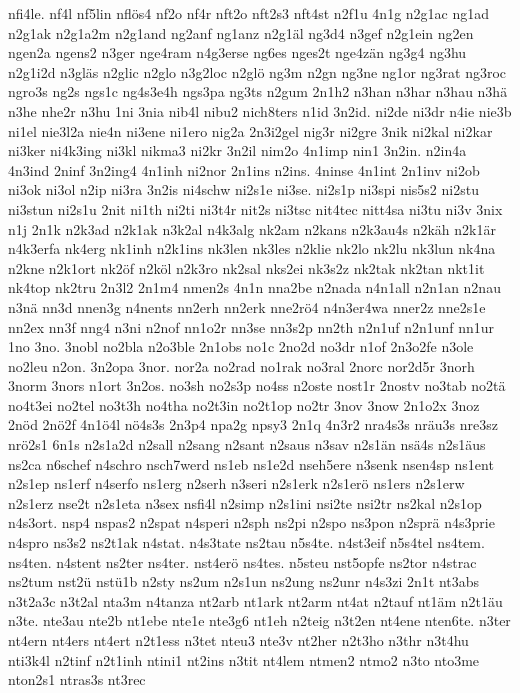 {nfi4le.
nf4l
nf5lin
nflös4
nf2o
nf4r
nft2o
nft2s3
nft4st
n2f1u
4n1g
n2g1ac
ng1ad
n2g1ak
n2g1a2m
n2g1and
ng2anf
ng1anz
n2g1äl
ng3d4
n3gef
n2g1ein
ng2en
ngen2a
ngens2
n3ger
nge4ram
n4g3erse
ng6es
nges2t
nge4zän
ng3g4
ng3hu
n2g1i2d
n3gläs
n2glic
n2glo
n3g2loc
n2glö
ng3m
n2gn
ng3ne
ng1or
ng3rat
ng3roc
ngro3s
ng2s
ngs1c
ng4s3e4h
ngs3pa
ng3ts
n2gum
2n1h2
n3han
n3har
n3hau
n3hä
n3he
nhe2r
n3hu
1ni
3nia
nib4l
nibu2
nich8ters
n1id
3n2id.
ni2de
ni3dr
n4ie
nie3b
ni1el
nie3l2a
nie4n
ni3ene
ni1ero
nig2a
2n3i2gel
nig3r
ni2gre
3nik
ni2kal
ni2kar
ni3ker
ni4k3ing
ni3kl
nikma3
ni2kr
3n2il
nim2o
4n1imp
nin1
3n2in.
n2in4a
4n3ind
2ninf
3n2ing4
4n1inh
ni2nor
2n1ins
n2ins.
4ninse
4n1int
2n1inv
ni2ob
ni3ok
ni3ol
n2ip
ni3ra
3n2is
ni4schw
ni2s1e
ni3se.
ni2s1p
ni3spi
nis5s2
ni2stu
ni3stun
ni2s1u
2nit
ni1th
ni2ti
ni3t4r
nit2s
ni3tsc
nit4tec
nitt4sa
ni3tu
ni3v
3nix
n1j
2n1k
n2k3ad
n2k1ak
n3k2al
n4k3alg
nk2am
n2kans
n2k3au4s
n2käh
n2k1är
n4k3erfa
nk4erg
nk1inh
n2k1ins
nk3len
nk3les
n2klie
nk2lo
nk2lu
nk3lun
nk4na
n2kne
n2k1ort
nk2öf
n2köl
n2k3ro
nk2sal
nks2ei
nk3s2z
nk2tak
nk2tan
nkt1it
nk4top
nk2tru
2n3l2
2n1m4
nmen2s
4n1n
nna2be
n2nada
n4n1all
n2n1an
n2nau
n3nä
nn3d
nnen3g
n4nents
nn2erh
nn2erk
nne2rö4
n4n3er4wa
nner2z
nne2s1e
nn2ex
nn3f
nng4
n3ni
n2nof
nn1o2r
nn3se
nn3s2p
nn2th
n2n1uf
n2n1unf
nn1ur
1no
3no.
3nobl
no2bla
n2o3ble
2n1obs
no1c
2no2d
no3dr
n1of
2n3o2fe
n3ole
no2leu
n2on.
3n2opa
3nor.
nor2a
no2rad
no1rak
no3ral
2norc
nor2d5r
3norh
3norm
3nors
n1ort
3n2os.
no3sh
no2s3p
no4ss
n2oste
nost1r
2nostv
no3tab
no2tä
no4t3ei
no2tel
no3t3h
no4tha
no2t3in
no2t1op
no2tr
3nov
3now
2n1o2x
3noz
2nöd
2nö2f
4n1ö4l
nö4s3s
2n3p4
npa2g
npsy3
2n1q
4n3r2
nra4s3s
nräu3s
nre3sz
nrö2s1
6n1s
n2s1a2d
n2sall
n2sang
n2sant
n2saus
n3sav
n2s1än
nsä4s
n2s1äus
ns2ca
n6schef
n4schro
nsch7werd
ns1eb
ns1e2d
nseh5ere
n3senk
nsen4sp
ns1ent
n2s1ep
ns1erf
n4serfo
ns1erg
n2serh
n3seri
n2s1erk
n2s1erö
ns1ers
n2s1erw
n2s1erz
nse2t
n2s1eta
n3sex
nsfi4l
n2simp
n2s1ini
nsi2te
nsi2tr
ns2kal
n2s1op
n4s3ort.
nsp4
nspas2
n2spat
n4speri
n2sph
ns2pi
n2spo
ns3pon
n2sprä
n4s3prie
n4spro
ns3s2
ns2t1ak
n4stat.
n4s3tate
ns2tau
n5s4te.
n4st3eif
n5s4tel
ns4tem.
ns4ten.
n4stent
ns2ter
ns4ter.
nst4erö
ns4tes.
n5steu
nst5opfe
ns2tor
n4strac
ns2tum
nst2ü
nstü1b
n2sty
ns2um
n2s1un
ns2ung
ns2unr
n4s3zi
2n1t
nt3abs
n3t2a3c
n3t2al
nta3m
n4tanza
nt2arb
nt1ark
nt2arm
nt4at
n2tauf
nt1äm
n2t1äu
n3te.
nte3au
nte2b
nt1ebe
nte1e
nte3g6
nt1eh
n2teig
n3t2en
nt4ene
nten6te.
n3ter
nt4ern
nt4ers
nt4ert
n2t1ess
n3tet
nteu3
nte3v
nt2her
n2t3ho
n3thr
n3t4hu
nti3k4l
n2tinf
n2t1inh
ntini1
nt2ins
n3tit
nt4lem
ntmen2
ntmo2
n3to
nto3me
nton2s1
ntras3s
nt3rec
}
